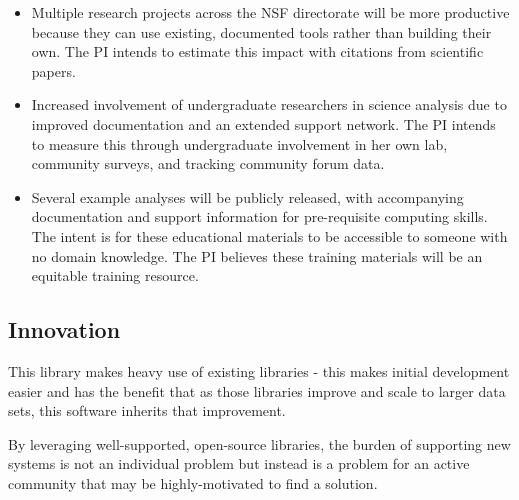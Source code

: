 \begin{itemize}
    \item Multiple research projects across the NSF directorate will be more productive because they can use existing, documented tools rather than building their own.  The PI intends to estimate this impact with citations from scientific papers.
    \item Increased involvement of undergraduate researchers in science analysis due to improved documentation and an extended support network.  The PI intends to measure this through undergraduate involvement in her own lab, community surveys, and tracking community forum data.
    \item Several example analyses will be publicly released, with accompanying documentation and support information for pre-requisite computing skills.  The intent is for these educational materials to be accessible to someone with no domain knowledge.  The PI believes these training materials will be an equitable training resource.
\end{itemize}


\subsection{Innovation}


This library makes heavy use of existing libraries - this makes initial development easier and has the benefit  that as those libraries improve and scale to larger data sets, this software inherits that improvement.  

By leveraging well-supported, open-source libraries, the burden of supporting new systems is not an individual problem but instead is a problem for an active community that may be highly-motivated to find a solution.  %


